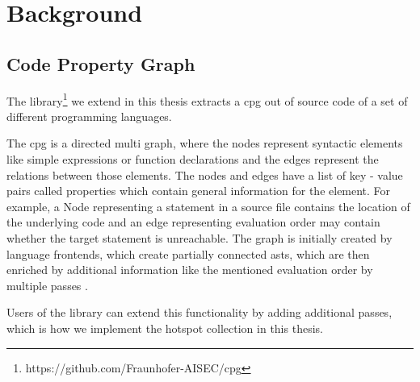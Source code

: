 \chapter{Background}
\label{chapter:Background}
\begin{comment}
What is the knowledge a undergrad student needs so that he/she can understand
your thesis? You can assume some familiarity with the very broad topic. E.g. if
you write a thesis in the area of software analysis, you do not have to explain
static/dynamic analysis as such (this is boring!). If you're a crypto guy, don't
explain AES in detail unless you try to break it in your thesis. If I stumble
across a word/term in your thesis and don't understand it, this is where I would
look it up (or on google).

Probably approx. 3-10 pages
\end{comment}

\section{Code Property Graph}
The library\footnote{https://github.com/Fraunhofer-AISEC/cpg} we extend in this thesis extracts a \ac{cpg} out of source code of a set of different programming languages.

The \ac{cpg} is a directed multi graph, where the nodes represent syntactic elements like simple expressions or function declarations and the edges represent the relations between those elements. The nodes and edges have a list of key - value pairs called properties which contain general information for the element. For example, a Node representing a statement in a source file contains the location of the underlying code and an edge representing evaluation order may contain whether the target statement is unreachable. The graph is initially created by language frontends, which create partially connected \acp{ast}, which are then enriched by additional information like the mentioned evaluation order by multiple passes \cite{cpg}.

Users of the library can extend this functionality by adding additional passes, which is how we implement the hotspot collection in this thesis.


